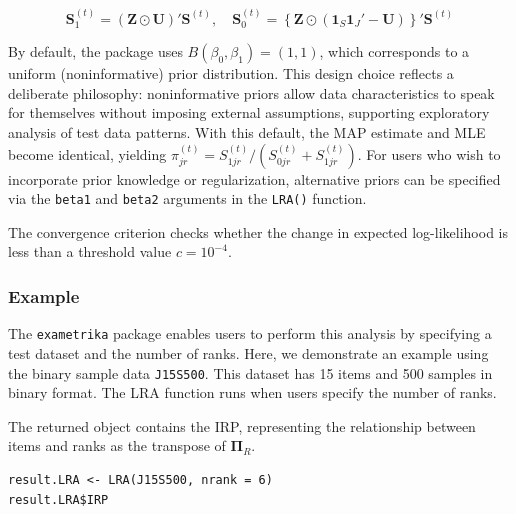 \[
\mathbf{S}_1^{(t)} = (\mathbf{Z} \odot \mathbf{U})' \mathbf{S}^{(t)}, \quad
\mathbf{S}_0^{(t)} = \left\{ \mathbf{Z} \odot (\mathbf{1}_S \mathbf{1}_J' - \mathbf{U}) \right\}' \mathbf{S}^{(t)}
\]

By default, the package uses \(B(\beta_0,\beta_1) = (1,1)\), which corresponds to a uniform (noninformative) prior distribution. This design choice reflects a deliberate philosophy: noninformative priors allow data characteristics to speak for themselves without imposing external assumptions, supporting exploratory analysis of test data patterns. With this default, the MAP estimate and MLE become identical, yielding \(\pi_{j r}^{(t)} = S_{1jr}^{(t)}/(S_{0jr}^{(t)} + S_{1jr}^{(t)})\). For users who wish to incorporate prior knowledge or regularization, alternative priors can be specified via the \texttt{beta1} and \texttt{beta2} arguments in the \texttt{LRA()} function.

The convergence criterion checks whether the change in expected log-likelihood is less than a threshold value \(c = 10^{-4}\).

\subsubsection{Example}\label{example}

The \texttt{exametrika} package enables users to perform this analysis by specifying a test dataset and the number of ranks. Here, we demonstrate an example using the binary sample data \texttt{J15S500}. This dataset has 15 items and 500 samples in binary format. The LRA function runs when users specify the number of ranks.

The returned object contains the IRP, representing the relationship between items and ranks as the transpose of \(\boldsymbol{\Pi}_R\).

\begin{verbatim}
result.LRA <- LRA(J15S500, nrank = 6)
result.LRA$IRP
\end{verbatim}

